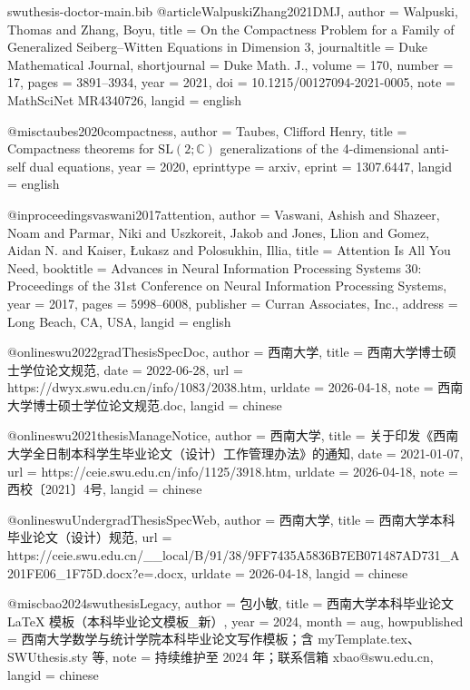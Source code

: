 \begin{filecontents*}[overwrite]{swuthesis-doctor-main.bib}
@article{WalpuskiZhang2021DMJ,
  author       = {Walpuski, Thomas and Zhang, Boyu},
  title        = {On the Compactness Problem for a Family of Generalized {Seiberg--Witten} Equations in Dimension 3},
  journaltitle = {Duke Mathematical Journal},
  shortjournal = {Duke Math. J.},
  volume       = {170},
  number       = {17},
  pages        = {3891--3934},
  year         = {2021},
  doi          = {10.1215/00127094-2021-0005},
  note         = {MathSciNet MR4340726},
  langid       = {english}
}

@misc{taubes2020compactness,
  author     = {Taubes, Clifford Henry},
  title      = {{Compactness theorems for $\mathrm{SL}(2;\mathbb{C})$ generalizations of the 4-dimensional anti-self dual equations}},
  year       = {2020},
  eprinttype = {arxiv},
  eprint     = {1307.6447},
  langid     = {english}
}

@inproceedings{vaswani2017attention,
  author    = {Vaswani, Ashish and Shazeer, Noam and Parmar, Niki and Uszkoreit, Jakob and Jones, Llion and Gomez, Aidan N. and Kaiser, {\L}ukasz and Polosukhin, Illia},
  title     = {Attention Is All You Need},
  booktitle = {Advances in Neural Information Processing Systems 30: Proceedings of the 31st Conference on Neural Information Processing Systems},
  year      = {2017},
  pages     = {5998--6008},
  publisher = {Curran Associates, Inc.},
  address   = {Long Beach, CA, USA},
  langid    = {english}
}

@online{swu2022gradThesisSpecDoc,
  author    = {{西南大学}},
  title     = {西南大学博士硕士学位论文规范},
  date      = {2022-06-28},
  url       = {https://dwyx.swu.edu.cn/info/1083/2038.htm},
  urldate   = {2026-04-18},
  note      = {西南大学博士硕士学位论文规范.doc},
  langid    = {chinese}
}

@online{swu2021thesisManageNotice,
  author    = {{西南大学}},
  title     = {关于印发《西南大学全日制本科学生毕业论文（设计）工作管理办法》的通知},
  date      = {2021-01-07},
  url       = {https://ceie.swu.edu.cn/info/1125/3918.htm},
  urldate   = {2026-04-18},
  note      = {西校〔2021〕4号},
  langid    = {chinese}
}

@online{swuUndergradThesisSpecWeb,
  author    = {{西南大学}},
  title     = {西南大学本科毕业论文（设计）规范},
  url       = {https://ceie.swu.edu.cn/__local/B/91/38/9FF7435A5836B7EB071487AD731_A201FE06_1F75D.docx?e=.docx},
  urldate   = {2026-04-18},
  langid    = {chinese}
}

@misc{bao2024swuthesisLegacy,
  author       = {包小敏},
  title        = {西南大学本科毕业论文 {\LaTeX} 模板（本科毕业论文模板\_新）},
  year         = {2024},
  month        = aug,
  howpublished = {西南大学数学与统计学院本科毕业论文写作模板；含 myTemplate.tex、SWUthesis.sty 等},
  note         = {持续维护至 2024 年；联系信箱 xbao@swu.edu.cn},
  langid       = {chinese}
}
\end{filecontents*}

